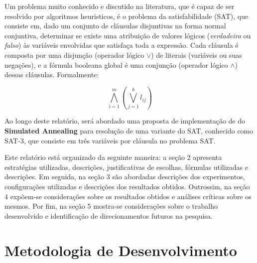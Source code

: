 \documentclass[12pt]{article}
\begin{document}
Um problema muito conhecido e discutido na literatura, que é capaz de ser resolvido por algoritmos heuristicos, é o problema da satisfabilidade (SAT), que consiste em, dado um conjunto de cláusulas disjuntivas na forma normal conjuntiva, determinar se existe uma atribuição de valores lógicos (\textit{verdadeiro} ou \textit{falso}) às variáveis envolvidas que satisfaça toda a expressão.
%
Cada cláusula é composta por uma disjunção (operador lógico $\lor$) de literais (variáveis ou suas negações), e a fórmula booleana global é uma conjunção (operador lógico $\land$) dessas cláusulas. Formalmente:

\begin{equation}
\bigwedge_{i=1}^{m} \left( \bigvee_{j=1}^{k} l_{ij} \right)
\end{equation}

Ao longo deste relatório, será abordado uma proposta de implementação de do \textbf{Simulated Annealing} para resolução de uma variante do SAT, conhecido como SAT-3, que consiste em três variáveis por cláusula no problema SAT.

Este relatório está organizado da seguinte maneira: a seção 2 apresenta estratégias utilizadas, descrições, justificativas de escolhas, fórmulas utilizadas e descrições. Em seguida, na seção 3 são abordadas descrições dos experimentos, configurações utilizadas e descrições dos resultados obtidos. Outrossim, na seção 4 expõem-se considerações sobre os resultados obtidos e análises críticas sobre os mesmos. Por fim, na seção 5 mostra-se considerações sobre o trabalho desenvolvido e identificação de direcionamentos futuros na pesquisa.



\section{Metodologia de Desenvolvimento}
\label{sec:metodologia_de_desenvolvimento}
\end{document}
